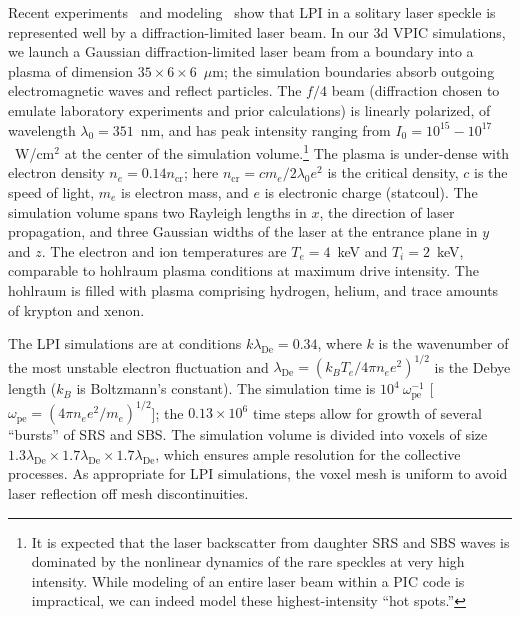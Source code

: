 \documentclass[journal,twoside]{IEEEtran}
\newcommand{\lde}      {\lambda_{\mathrm{De}}}
\newcommand{\wpe}      {\omega_{\mathrm{pe}}}
\begin{document}
Recent experiments~\cite{Kline_PRL_2005} and
modeling~\cite{Yin_et_al_PRL_2007_SRS} show that LPI in a solitary
laser speckle is represented well by a diffraction-limited laser beam.
In our 3d VPIC simulations, we launch a Gaussian diffraction-limited
laser beam from a boundary into a plasma of dimension $35 \times 6
\times 6$~$\mu$m; the simulation boundaries absorb outgoing
electromagnetic waves and reflect particles.  The $f/4$ beam
(diffraction chosen to emulate laboratory experiments and prior
calculations) is linearly polarized, of wavelength $\lambda_0 =
351$~nm, and has peak intensity ranging from $I_0 = 10^{15} -
10^{17}$~W/cm$^2$ at the center of the simulation volume.\footnote{It
is expected that the laser backscatter from daughter SRS and SBS waves
is dominated by the nonlinear dynamics of the rare speckles at very
high intensity.  While modeling of an entire laser beam within a PIC
code is impractical, we can indeed model these highest-intensity ``hot
spots.''}
The plasma is under-dense with electron density $n_e = 0.14
n_{\mathrm{cr}}$; here $n_{\mathrm{cr}} = c m_e / 2 \lambda_0 e^2$ is
the critical density, $c$ is the speed of light, $m_e$ is electron
mass, and $e$ is electronic charge (statcoul).  The simulation volume
spans two Rayleigh lengths in $x$, the direction of laser propagation,
and three Gaussian widths of the laser at the entrance plane in $y$
and $z$.  The electron and ion temperatures are $T_e = 4$~keV and $T_i
= 2$~keV, comparable to hohlraum plasma conditions at maximum drive
intensity.  The hohlraum is filled with plasma comprising hydrogen,
helium, and trace amounts of krypton and xenon.

The LPI simulations are at conditions $k \lde = 0.34$, where $k$ is
the wavenumber of the most unstable electron fluctuation and $\lde =
(k_B T_e / 4 \pi n_e e^2)^{1/2}$ is the Debye length ($k_B$ is
Boltzmann's constant).  The simulation time is $10^4~\wpe^{-1}$ [$\wpe
= (4 \pi n_e e^2 / m_e)^{1/2}$]; the $0.13 \times 10^6$ time steps
allow for growth of several ``bursts'' of SRS and SBS.  The simulation
volume is divided into voxels of size $1.3\lde \times 1.7\lde \times
1.7\lde$, which ensures ample resolution for the collective processes.
As appropriate for LPI simulations, the voxel mesh is uniform to avoid
laser reflection off mesh discontinuities.
\end{document}
